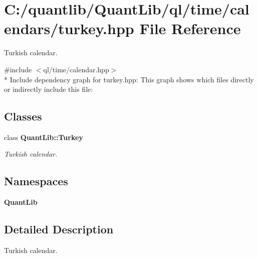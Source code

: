 \section{C\+:/quantlib/\+Quant\+Lib/ql/time/calendars/turkey.hpp File Reference}
\label{turkey_8hpp}


Turkish calendar.  


{\ttfamily \#include $<$ql/time/calendar.\+hpp$>$}\\*
Include dependency graph for turkey.\+hpp\+:
This graph shows which files directly or indirectly include this file\+:
\subsection*{Classes}
\begin{DoxyCompactItemize}
\item 
class {\bf Quant\+Lib\+::\+Turkey}
\begin{DoxyCompactList}\small\item\em Turkish calendar. \end{DoxyCompactList}\end{DoxyCompactItemize}
\subsection*{Namespaces}
\begin{DoxyCompactItemize}
\item 
 {\bf Quant\+Lib}
\end{DoxyCompactItemize}


\subsection{Detailed Description}
Turkish calendar. 

